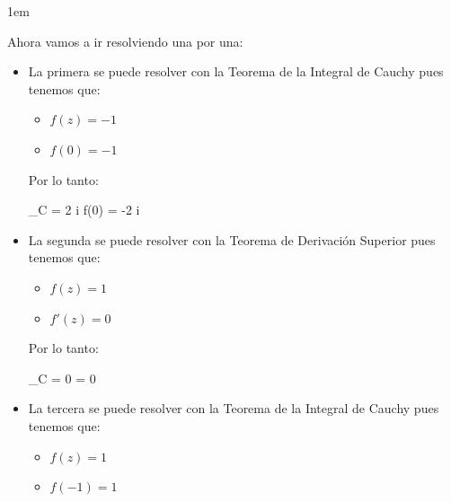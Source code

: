 \documentclass[12pt, fleqn]{report}                             %
\newenvironment{SmallIndentation}[1][0.75em]                    %
        {\begin{adjustwidth}{#1}{}\begin{footnotesize}}             %
        {\end{footnotesize}\end{adjustwidth}}                       %
\def \Eq {equation}                                             %
\newenvironment{MultiLineEquation*}[1]                          %
        {\begin{\Eq*}\begin{alignedat}{#1}}                         %
        {\end{alignedat}\end{\Eq*}}                                 %
\theoremstyle{break}                                            %
\begin{document}
\begin{SmallIndentation}[1em]
                    Ahora vamos a ir resolviendo una por una:
                    \begin{itemize}
                        \item
                            La primera se puede resolver con la Teorema de la Integral de Cauchy
                            pues tenemos que:
                            \begin{itemize}
                                \item $f(z) = -1$
                                \item $f(0) = -1$
                            \end{itemize}

                            Por lo tanto:
                            \begin{MultiLineEquation*}{3}
                                \oint_C  = 2 \pi i f(0) = -2 \pi i
                            \end{MultiLineEquation*}


                        \item
                            La segunda se puede resolver con la Teorema de Derivación Superior
                            pues tenemos que:
                            \begin{itemize}
                                \item $f(z) = 1$
                                \item $f'(z) = 0$
                            \end{itemize}

                            Por lo tanto:
                            \begin{MultiLineEquation*}{3}
                                \oint_C  =  0 = 0 
                            \end{MultiLineEquation*}


                        \item
                            La tercera se puede resolver con la Teorema de la Integral de Cauchy
                            pues tenemos que:
                            \begin{itemize}
                                \item $f(z) = 1$
                                \item $f(-1) = 1$
                            \end{itemize}


\end{itemize}
\end{SmallIndentation}
\end{document}
